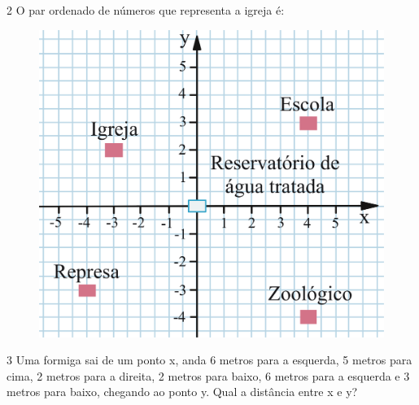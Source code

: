 \begin{emptybox}
\end{emptybox}

\pagebreak
\num{2} O par ordenado de números que representa a igreja é:

\begin{figure}[htpb!]
\centering
\includegraphics[width=\textwidth]{./ilustras-mat/modulo_10-atividade_2.png}
\end{figure}

\begin{emptybox}
\vspace{5cm}
\end{emptybox}

\pagebreak
\num{3} Uma formiga sai de um ponto x, anda 6 metros para a esquerda, 5
metros para cima, 2 metros para a direita, 2 metros para baixo, 6 metros
para a esquerda e 3 metros para baixo, chegando ao ponto y. Qual a
distância entre x e y?

